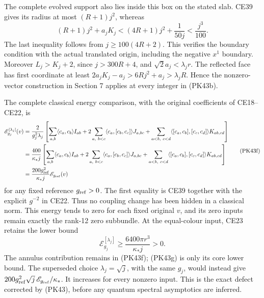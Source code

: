 \documentclass[11pt]{article}
\begin{document}
The complete evolved support also lies inside this box on the stated slab.
CE39 gives its radius at most \((R+1)j^2\), whereas
\[
 (R+1)j^2+a_jK_j
 <(4R+1)j^2+\frac1{50j}<\frac{j^3}{100}.
 \tag{PK43e}
\]
The last inequality follows from \(j\ge100(4R+2)\). This verifies the
boundary condition with the actual translated origin, including the
negative \(x^1\) boundary. Moreover \(L_j>K_j+2\), since
\(j>300R+4\), and \(\sqrt2a_j<\lambda_jr\). The reflected face has
first coordinate at least \(2a_jK_j-a_j>6Rj^2+a_j>\lambda_jR\).
Hence the nonzero-vector construction in Section 7 applies at every
integer in (PK43b).

The complete classical energy comparison, with the original coefficients
of CE18–CE22, is
\[
 \begin{aligned}
 \mathscr E_{g_j}^{[\lambda_j]}(v)
 &=\frac{2}{g_j^2\lambda_j}\left[
   \sum_{a,b}\langle c_a,c_b\rangle I_{ab}
   +2\sum_{a,\ b<c}\langle c_a,[c_b,c_c]\rangle J_{a,bc}
   +\sum_{a<b,\ c<d}\langle[c_a,c_b],[c_c,c_d]\rangle K_{ab,cd}
   \right]\\
 &=\frac{400}{\kappa_*j}\left[
   \sum_{a,b}\langle c_a,c_b\rangle I_{ab}
   +2\sum_{a,\ b<c}\langle c_a,[c_b,c_c]\rangle J_{a,bc}
   +\sum_{a<b,\ c<d}\langle[c_a,c_b],[c_c,c_d]\rangle K_{ab,cd}
   \right]\\
 &=\frac{200g_{\rm ref}^2}{\kappa_*j}\mathscr E_{g_{\rm ref}}(v)
 \end{aligned}\tag{PK43f}
\]
for any fixed reference \(g_{\rm ref}>0\). The first equality is CE39
together with the explicit \(g^{-2}\) in CE22. Thus no coupling change
has been hidden in a classical norm. This energy tends to zero for each
fixed original \(v\), and its zero inputs remain exactly the rank-12
zero subbundle. At the equal-colour input, CE23 retains the lower bound
\[
 \mathscr E_{g_j}^{[\lambda_j]}
 \ge\frac{6400\pi r^3}{\kappa_*j}>0.
 \tag{PK43g}
\]
The annulus contribution remains in (PK43f); (PK43g) is only its core
lower bound. The superseded choice \(\lambda_j=\sqrt j\), with the same
\(g_j\), would instead give
\(200g_{\rm ref}^2\sqrt j\,\mathscr E_{g_{\rm ref}}/\kappa_*\).
It increases for every nonzero input. This is the exact defect corrected
by (PK43), before any quantum spectral asymptotics are inferred.
\end{document}
